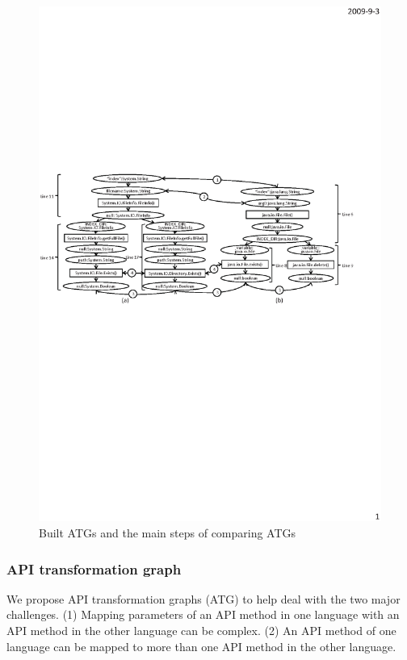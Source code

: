 \begin{figure}[t]
\centering
\includegraphics[scale=1.1,clip]{figure/graph.eps}\vspace*{-3ex}
 \caption
{\label{fig:graph}Built ATGs and the main steps of comparing
ATGs}\vspace*{-3.5ex}
\end{figure}

\subsubsection{API transformation graph}

We propose API transformation graphs (ATG) to help deal with the two
major challenges. (1) Mapping parameters of an API method in one language with an API
method in the other language can be complex. (2) An API
method of one language can be mapped to more than one API method in the
other language.

